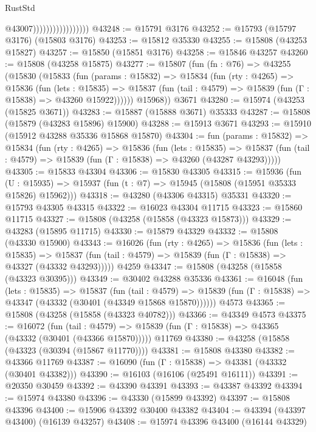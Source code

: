 \begin{lexlean}{RustStd}
\begin{coremodule}
                                      @43007)))))))))))))))))
@43248 := @15791 @3176
@43252 := @15793 (@15797 @3176) (@15803 @3176)
@43253 := @15812 @35330
@43255 := @15808 (@43253 @15827)
@43257 := @15850 (@15851 @3176)
@43258 := @15846 @43257
@43260 := @15808 (@43258 @15875)
@43277 := @15807
    (fun (fn : @76) =>
    @43255
      (@15830
        (@15833
          (fun (params : @15832) =>
          @15834
            (fun (rty : @4265) =>
            @15836
              (fun (lets : @15835) =>
              @15837 (fun (tail : @4579) => @15839 (fun (Γ : @15838) => @43260 @15922))))))
        @15968))
    @3671
@43280 := @15974 (@43253 (@15825 @3671))
@43283 := @15887 (@15888 @3671) @35333
@43287 := @15808 (@15879 (@43283 @15896) @15900)
@43288 := @15913 @3671
@43293 := @15910 (@15912 @43288 @35336 @15868 @15870)
@43304 := fun (params : @15832) =>
  @15834
    (fun (rty : @4265) =>
    @15836
      (fun (lets : @15835) =>
      @15837 (fun (tail : @4579) => @15839 (fun (Γ : @15838) => @43260 (@43287 @43293)))))
@43305 := @15833 @43304
@43306 := @15830 @43305
@43315 := @15936
    (fun (U : @15935) => @15937 (fun (t : @7) => @15945 (@15808 (@15951 @35333 @15826) @15962)))
@43318 := @43280 (@43306 @43315) @35331
@43320 := @15793 @43305 @43315
@43322 := @16023 @43304 @11715
@43323 := @15860 @11715
@43327 := @15808 (@43258 (@15858 (@43323 @15873)))
@43329 := @43283 (@15895 @11715)
@43330 := @15879 @43329
@43332 := @15808 (@43330 @15900)
@43343 := @16026
    (fun (rty : @4265) =>
    @15836
      (fun (lets : @15835) =>
      @15837 (fun (tail : @4579) => @15839 (fun (Γ : @15838) => @43327 (@43332 @43293)))))
    @4259
@43347 := @15808 (@43258 (@15858 (@43323 @30395)))
@43349 := @30402 @43288 @35336
@43361 := @16048
    (fun (lets : @15835) =>
    @15837
      (fun (tail : @4579) =>
      @15839 (fun (Γ : @15838) => @43347 (@43332 (@30401 (@43349 @15868 @15870))))))
    @4573
@43365 := @15808 (@43258 (@15858 (@43323 @40782)))
@43366 := @43349 @4573
@43375 := @16072
    (fun (tail : @4579) => @15839 (fun (Γ : @15838) => @43365 (@43332 (@30401 (@43366 @15870)))))
    @11769
@43380 := @43258 (@15858 (@43323 (@30394 (@15867 @11770))))
@43381 := @15808 @43380
@43382 := @43366 @11769
@43387 := @16090 (fun (Γ : @15838) => @43381 (@43332 (@30401 @43382)))
@43390 := @16103 (@16106 (@25491 @16111))
@43391 := @20350 @30459
@43392 := @43390 @43391
@43393 := @43387 @43392
@43394 := @15974 @43380
@43396 := @43330 (@15899 @43392)
@43397 := @15808 @43396
@43400 := @15906 @43392 @30400 @43382
@43404 := @43394 (@43397 @43400) (@16139 @43257)
@43408 := @15974 @43396 @43400 (@16144 @43329)

\end{coremodule}
\end{lexlean}

